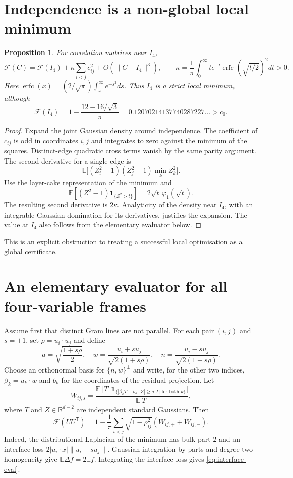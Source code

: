 \documentclass[11pt,a4paper]{article}
\newtheorem{proposition}[theorem]{Proposition}
\theoremstyle{remark}\newtheorem{remark}[theorem]{Remark}
\newcommand{\E}{\mathbb E}
\newcommand{\R}{\mathbb R}
\newcommand{\F}{\mathcal F}
\begin{document}
\section{Independence is a non-global local minimum}
\begin{proposition}
For correlation matrices near $I_4$,
\begin{equation}\label{eq:i-expansion}
 \F(C)=\F(I_4)+\kappa\sum_{i<j}c_{ij}^2+O(\|C-I_4\|^3),
 \qquad
 \kappa=\frac1\pi\int_0^\infty t e^{-t}
 \operatorname{erfc}(\sqrt{t/2})^2dt>0.
\end{equation}
Here $\operatorname{erfc}(x)=(2/\sqrt\pi)\int_x^\infty e^{-s^2}ds$. Thus $I_4$ is a strict local minimum, although
\[
 \F(I_4)=1-\frac{12-16/\sqrt3}{\pi}
 =0.12070214137740287227\ldots>c_0.
\]
\end{proposition}
\begin{proof}
Expand the joint Gaussian density around independence. The coefficient of $c_{ij}$ is odd in coordinates $i,j$ and integrates to zero against the minimum of the squares. Distinct-edge quadratic cross terms vanish by the same parity argument. The second derivative for a single edge is
\[
 \E\big[(Z_i^2-1)(Z_j^2-1)\min_k Z_k^2\big].
\]
Use the layer-cake representation of the minimum and
\[
 \E[(Z^2-1)\mathbf1_{\{Z^2>t\}}]
 =2\sqrt t\,\varphi_1(\sqrt t).
\]
The resulting second derivative is $2\kappa$. Analyticity of the density near $I_4$, with an integrable Gaussian domination for its derivatives, justifies the expansion. The value at $I_4$ also follows from the elementary evaluator below.
\end{proof}
This is an explicit obstruction to treating a successful local optimisation as a global certificate.

\section{An elementary evaluator for all four-variable frames}\label{sec:interface}
Assume first that distinct Gram lines are not parallel. For each pair $(i,j)$ and $s=\pm1$, set $\rho=u_i\cdot u_j$ and define
\[
 a=\sqrt{\frac{1+s\rho}{2}},\quad
 w=\frac{u_i+su_j}{\sqrt{2(1+s\rho)}},\quad
 n=\frac{u_i-su_j}{\sqrt{2(1-s\rho)}}.
\]
Choose an orthonormal basis for $\{n,w\}^{\perp}$ and write, for the other two indices,
$\beta_k=u_k\cdot w$ and $b_k$ for the coordinates of the residual projection.
Let
\[
 W_{ij,s}=\frac{\E\big[|T|\,
 \mathbf1_{\{|\beta_kT+b_k\cdot Z|\geq a|T|\text{ for both }k\}}\big]}{\E|T|},
\]
where $T$ and $Z\in\R^{d-2}$ are independent standard Gaussians. Then
\begin{equation}\label{eq:interface-eval}
 \boxed{\F(UU^{\mathsf T})
 =1-\frac1\pi\sum_{i<j}\sqrt{1-\rho_{ij}^2}
 (W_{ij,+}+W_{ij,-}).}
\end{equation}
Indeed, the distributional Laplacian of the minimum has bulk part $2$ and an interface loss $2|u_i\cdot x|\|u_i-su_j\|$. Gaussian integration by parts and degree-two homogeneity give $\E\Delta f=2\E f$. Integrating the interface loss gives \eqref{eq:interface-eval}.
\end{document}
